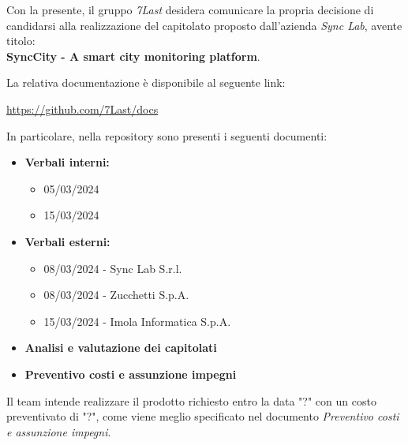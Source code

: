 \documentclass[italian,12pt]{article} %
\begin{document}


\newpage



\vspace{14pt}

Con la presente, il gruppo \textit{7Last} desidera comunicare la propria decisione di candidarsi alla realizzazione
del capitolato proposto dall'azienda \textit{Sync Lab}, avente titolo: \\ \textbf{SyncCity - A smart city monitoring 
platform}.

\vspace{14pt}

La relativa documentazione è disponibile al seguente link:
\begin{center}
    \textcolor{blue}{\url{https://github.com/7Last/docs}}
\end{center}

\vspace{14pt}

In particolare, nella repository sono presenti i seguenti documenti:
\begin{itemize}
	\item{\textbf{Verbali interni:}}
		\begin{itemize}
			\item{05/03/2024}
			\item{15/03/2024}
		\end{itemize}

	\item{\textbf{Verbali esterni:}}
		\begin{itemize}
			\item{08/03/2024 - Sync Lab S.r.l.}
			\item{08/03/2024 - Zucchetti S.p.A.}
			\item{15/03/2024 - Imola Informatica S.p.A.}
		\end{itemize}
	
	\item{\textbf{Analisi e valutazione dei capitolati}}
	\item{\textbf{Preventivo costi e assunzione impegni}}
\end{itemize}

\vspace{14pt}

Il team intende realizzare il prodotto richiesto entro la data "?" con un costo preventivato di "?",
come viene meglio specificato nel documento \textit{Preventivo costi e assunzione impegni}.
\end{document}
